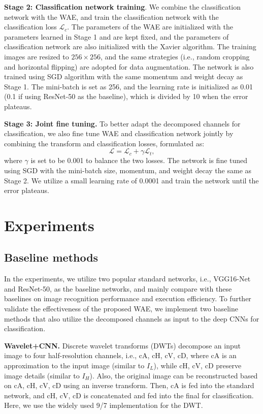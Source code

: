 \documentclass[letterpaper]{article} %
\begin{document}
\noindent\textbf{Stage 2: Classification network training}. We combine the classification network with the WAE, and train the classification network with the classification loss $\mathcal{L}_{{c}}$. The parameters of the WAE are initialized with the parameters learned in Stage 1 and are kept fixed, and the parameters of classification network are also initialized with the Xavier algorithm. The training images are resized to $256 \times 256$, and the same strategies (i.e., random cropping and horizontal flipping) are adopted for data augmentation. The network is also trained using SGD algorithm with the same momentum and weight decay as Stage 1. The mini-batch is set as 256, and the learning rate is initialized as 0.01 (0.1 if using ResNet-50 as the baseline), which is divided by 10 when the error plateaus.

\noindent\textbf{Stage 3: Joint fine tuning.} To better adapt the decomposed channels for classification, we also fine tune WAE and classification network jointly by combining the transform and classification losses, formulated as:
 \begin{equation}
      \mathcal{L}=\mathcal{L}_c+\gamma\mathcal{L}_t,
\end{equation}
where $\gamma$ is set to be 0.001 to balance the two losses. The network is fine tuned using SGD with the mini-batch size, momentum, and weight decay the same as Stage 2. We utilize a small learning rate of 0.0001 and train the network until the error plateaus.

\section{Experiments}
\subsection{Baseline methods}
In the experiments, we utilize two popular standard networks, i.e., VGG16-Net and ResNet-50, as the baseline networks, and mainly compare with these baselines on image recognition performance and execution efficiency. To further validate the effectiveness of the proposed WAE, we implement two baseline methods that also utilize the decomposed channels as input to the deep CNNs for classification.

\noindent\textbf{Wavelet+CNN. }Discrete wavelet transforms (DWTs) decompose an input image to four half-resolution channels, i.e., cA, cH, cV, cD, where cA is an approximation to the input image (similar to $I_L$), while cH, cV, cD preserve image details (similar to $I_H$). Also, the original image can be reconstructed based on cA, cH, cV, cD using an inverse transform. Then, cA is fed into the standard network, and cH, cV, cD is concatenated and fed into the final for classification. Here, we use the widely used 9/7 implementation \cite{zhang2011fsim} for the DWT.
\end{document}
